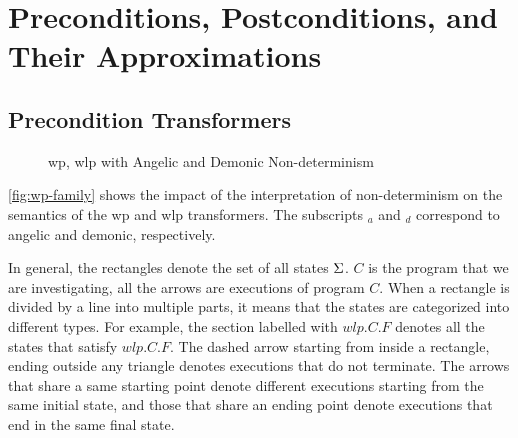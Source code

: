 \chapter{Preconditions, Postconditions, and Their Approximations}\label{ch:appr} %

\section{Precondition Transformers}
\begin{figure}[ht!]\centering
	\hfill

	\hfill
	\caption{wp, wlp with Angelic and Demonic Non-determinism}
	\label{fig:wp-family}
\end{figure}

\autoref{fig:wp-family} shows the impact of the interpretation of non-determinism on the semantics of the wp and wlp transformers. 
The subscripts $_a$ and $_d$ correspond to angelic and demonic, respectively. 

In general, the rectangles denote the set of all states $\S$. 
$C$ is the program that we are investigating, all the arrows are executions of program $C$. 
When a rectangle is divided by a line into multiple parts, it means that the states are categorized into different types. 
For example, the section  labelled with $wlp.C.F$ denotes all the states that satisfy $wlp.C.F$. 
The dashed arrow starting from inside a rectangle, ending outside any triangle denotes executions that do not terminate. 
The arrows that share a same starting point denote different executions starting from the same initial state, and those that share an ending point denote executions that end in the same final state. 

